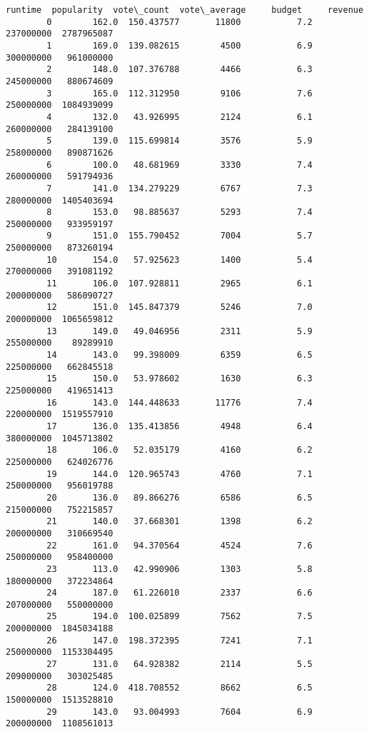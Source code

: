 \documentclass[11pt]{article}
\begin{document}
\begin{Verbatim}[commandchars=\\\{\}]
               runtime  popularity  vote\_count  vote\_average     budget     revenue  
        0        162.0  150.437577       11800           7.2  237000000  2787965087  
        1        169.0  139.082615        4500           6.9  300000000   961000000  
        2        148.0  107.376788        4466           6.3  245000000   880674609  
        3        165.0  112.312950        9106           7.6  250000000  1084939099  
        4        132.0   43.926995        2124           6.1  260000000   284139100  
        5        139.0  115.699814        3576           5.9  258000000   890871626  
        6        100.0   48.681969        3330           7.4  260000000   591794936  
        7        141.0  134.279229        6767           7.3  280000000  1405403694  
        8        153.0   98.885637        5293           7.4  250000000   933959197  
        9        151.0  155.790452        7004           5.7  250000000   873260194  
        10       154.0   57.925623        1400           5.4  270000000   391081192  
        11       106.0  107.928811        2965           6.1  200000000   586090727  
        12       151.0  145.847379        5246           7.0  200000000  1065659812  
        13       149.0   49.046956        2311           5.9  255000000    89289910  
        14       143.0   99.398009        6359           6.5  225000000   662845518  
        15       150.0   53.978602        1630           6.3  225000000   419651413  
        16       143.0  144.448633       11776           7.4  220000000  1519557910  
        17       136.0  135.413856        4948           6.4  380000000  1045713802  
        18       106.0   52.035179        4160           6.2  225000000   624026776  
        19       144.0  120.965743        4760           7.1  250000000   956019788  
        20       136.0   89.866276        6586           6.5  215000000   752215857  
        21       140.0   37.668301        1398           6.2  200000000   310669540  
        22       161.0   94.370564        4524           7.6  250000000   958400000  
        23       113.0   42.990906        1303           5.8  180000000   372234864  
        24       187.0   61.226010        2337           6.6  207000000   550000000  
        25       194.0  100.025899        7562           7.5  200000000  1845034188  
        26       147.0  198.372395        7241           7.1  250000000  1153304495  
        27       131.0   64.928382        2114           5.5  209000000   303025485  
        28       124.0  418.708552        8662           6.5  150000000  1513528810  
        29       143.0   93.004993        7604           6.9  200000000  1108561013  

\end{Verbatim}
\end{document}
